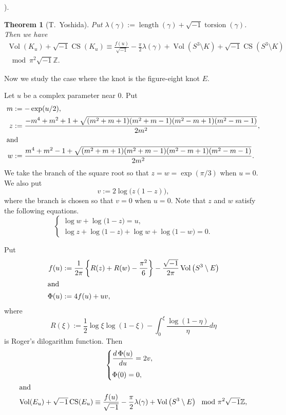\documentclass[a4paper]{amsart}
\theoremstyle{plain}
\newtheorem{thm}{Theorem}[section]
\theoremstyle{definition}
\theoremstyle{remark}
\newcommand{\Z}{\mathbb{Z}}
\newcommand{\Vol}{\operatorname{Vol}}
\newcommand{\CS}{\operatorname{CS}}
\newcommand{\length}{\operatorname{length}}
\newcommand{\torsion}{\operatorname{torsion}}
\numberwithin{equation}{section}
\begin{document}
\cite[Conjecture]{Neumann/Zagier:TOPOL85}).
\begin{thm}[T.~Yoshida]\label{thm:Yoshida}
Put $\lambda(\gamma):=\length(\gamma)+\sqrt{-1}\torsion(\gamma)$.
Then we have
\begin{multline*}
  \Vol(K_{u})+\sqrt{-1}\CS(K_{u})
  \equiv
  \frac{f(u)}{\sqrt{-1}}
  -\frac{\pi}{2}\lambda(\gamma)
  +\Vol\left(S^3\setminus{K}\right)+\sqrt{-1}\CS\left(S^3\setminus{K}\right)
  \\
  \mod{\pi^2\sqrt{-1}\Z}.
\end{multline*}
\end{thm}
\par
Now we study the case where the knot is the figure-eight knot $E$.
\par
Let $u$ be a complex parameter near $0$.
Put
\begin{align*}
  m&:=-\exp(u/2),
  \\
  z&:=\frac{-m^4+m^2+1+\sqrt{(m^2+m+1)(m^2+m-1)(m^2-m+1)(m^2-m-1)}}{2m^2},
  \\
  \intertext{and}
  w&:=\frac{m^4+m^2-1+\sqrt{(m^2+m+1)(m^2+m-1)(m^2-m+1)(m^2-m-1)}}{2m^2}.
\end{align*}
We take the branch of the square root so that $z=w=\exp(\pi/3)$ when
$u=0$.
We also put
\begin{equation*}
  v:=2\log\bigl(z(1-z)\bigr),
\end{equation*}
where the branch is chosen so that $v=0$ when $u=0$.
Note that $z$ and $w$ satisfy the following equations.
\begin{equation*}
  \begin{cases}
    \log{w}+\log\bigl(1-z\bigr)=u,
    \\
    \log{z}+\log\bigl(1-z\bigr)+\log{w}+\log\bigl(1-w\bigr)=0.
  \end{cases}
\end{equation*}
\par
Put
\begin{align*}
  f(u)&:=\frac{1}{2\pi}\left\{R(z)+R(w)-\frac{\pi^2}{6}\right\}
        -\frac{\sqrt{-1}}{2\pi}\Vol\left(S^3\setminus{E}\right)
  \\
  \intertext{and}
  \Phi(u)&:=4f(u)+uv,
\end{align*}
where
\begin{equation*}
  R(\xi):=\frac{1}{2}\log{\xi}\log(1-\xi)
  -\int_{0}^{\xi}\frac{\log(1-\eta)}{\eta}d\eta
\end{equation*}
is Roger's dilogarithm function.
Then
\begin{gather*}
  \begin{cases}
    \dfrac{d\,\Phi(u)}{du}=2v,
    \\[3mm]
    \Phi(0)=0,
  \end{cases}
  \\
  \intertext{and}
  \Vol(E_u)+\sqrt{-1}\CS(E_u)
  \equiv
  \frac{f(u)}{\sqrt{-1}}-\frac{\pi}{2}\lambda(\gamma)
  +\Vol\left(S^3\setminus{E}\right)
  \mod{\pi^2\sqrt{-1}\Z},
\end{gather*}
\end{document}
